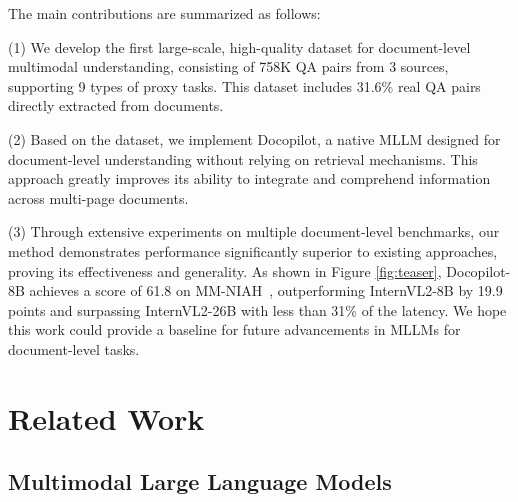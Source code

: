 \documentclass[10pt,twocolumn,letterpaper]{article}
\def\modelname{Docopilot\xspace}
\begin{document}
\begin{CJK}{UTF8}{gbsn}
The main contributions are summarized as follows:

(1) We develop the first large-scale, high-quality dataset for document-level multimodal understanding, consisting of 758K QA pairs from 3 sources, supporting 9 types of proxy tasks. This dataset includes 31.6\% real QA pairs directly extracted from documents.

(2) Based on the dataset, we implement Docopilot, a native MLLM designed for document-level understanding without relying on retrieval mechanisms. 
This approach greatly improves its ability to integrate and comprehend information across multi-page documents.

(3) Through extensive experiments on multiple document-level benchmarks, our method demonstrates performance significantly superior to existing approaches, proving its effectiveness and generality. 
As shown in Figure \ref{fig:teaser}, \modelname-8B achieves a score of 61.8 on MM-NIAH~\cite{wang2024mmniah}, outperforming InternVL2-8B by 19.9 points and surpassing InternVL2-26B with less than 31\% of the latency.
We hope this work could provide a baseline for future advancements in MLLMs for document-level tasks.


\section{Related Work}

\subsection{Multimodal Large Language Models}


\end{CJK}
\end{document}
